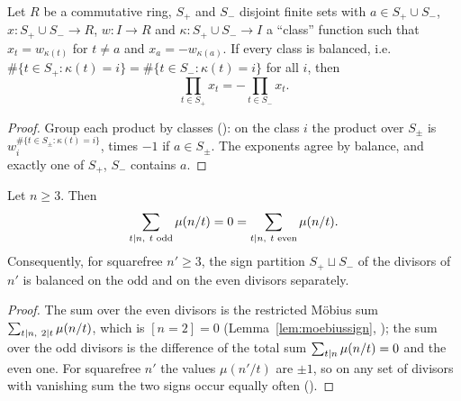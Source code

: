 \begin{lemma}
  \label{lem:li-classes}
  \leanok
  Let $R$ be a commutative ring, $S_+$ and $S_-$ disjoint finite sets with $a \in S_+ \cup S_-$,
  $x \colon S_+ \cup S_- \to R$, $w \colon I \to R$ and $\kappa \colon S_+ \cup S_- \to I$ a
  ``class'' function such that $x_t = w_{\kappa(t)}$ for $t \ne a$ and $x_a = -w_{\kappa(a)}$. If
  every class is balanced, i.e.\ $\#\{t \in S_+ : \kappa(t) = i\} = \#\{t \in S_- : \kappa(t) = i\}$
  for all $i$, then
  \[ \prod_{t \in S_+} x_t = -\prod_{t \in S_-} x_t. \]
\end{lemma}
\begin{proof}
  \leanok
  Group each product by classes (): on the class $i$ the product over
  $S_\pm$ is $w_i^{\#\{t \in S_\pm : \kappa(t) = i\}}$, times $-1$ if $a \in S_\pm$. The exponents
  agree by balance, and exactly one of $S_+$, $S_-$ contains $a$.
\end{proof}

\begin{lemma}
  \label{lem:li-parity}
  \leanok
  Let $n \ge 3$. Then
  \[ \sum_{t \mathrel{\mid} n,\ t \text{ odd}} \mu(n/t) = 0
     = \sum_{t \mathrel{\mid} n,\ t \text{ even}} \mu(n/t). \]
  Consequently, for squarefree $n' \ge 3$, the sign partition $S_+ \sqcup S_-$ of the divisors of
  $n'$ is balanced on the odd and on the even divisors separately.
\end{lemma}
\begin{proof}
  \leanok
  The sum over the even divisors is the restricted Möbius sum $\sum_{t \mathrel{\mid} n,\ 2 \mathrel{\mid} t} \mu(n/t)$,
  which is $[n = 2] = 0$ (Lemma~\ref{lem:moebiussign},
  ); the sum over the odd divisors is the
  difference of the total sum $\sum_{t \mathrel{\mid} n} \mu(n/t) = 0$ and the even one. For squarefree
  $n'$ the values $\mu(n'/t)$ are $\pm 1$, so on any set of divisors with vanishing sum the two
  signs occur equally often ().
\end{proof}

